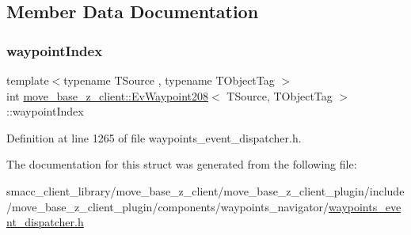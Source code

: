 \subsection{Member Data Documentation}
\mbox{\label{structmove__base__z__client_1_1EvWaypoint208_af7e34d35df8705dfa1915a4c76e17f75}} 
\subsubsection{\texorpdfstring{waypoint\+Index}{waypointIndex}}
{\footnotesize\ttfamily template$<$typename T\+Source , typename T\+Object\+Tag $>$ \\
int \hyperlink{structmove__base__z__client_1_1EvWaypoint208}{move\+\_\+base\+\_\+z\+\_\+client\+::\+Ev\+Waypoint208}$<$ T\+Source, T\+Object\+Tag $>$\+::waypoint\+Index}



Definition at line 1265 of file waypoints\+\_\+event\+\_\+dispatcher.\+h.



The documentation for this struct was generated from the following file\+:\begin{DoxyCompactItemize}
\item 
smacc\+\_\+client\+\_\+library/move\+\_\+base\+\_\+z\+\_\+client/move\+\_\+base\+\_\+z\+\_\+client\+\_\+plugin/include/move\+\_\+base\+\_\+z\+\_\+client\+\_\+plugin/components/waypoints\+\_\+navigator/\hyperlink{waypoints__event__dispatcher_8h}{waypoints\+\_\+event\+\_\+dispatcher.\+h}\end{DoxyCompactItemize}
